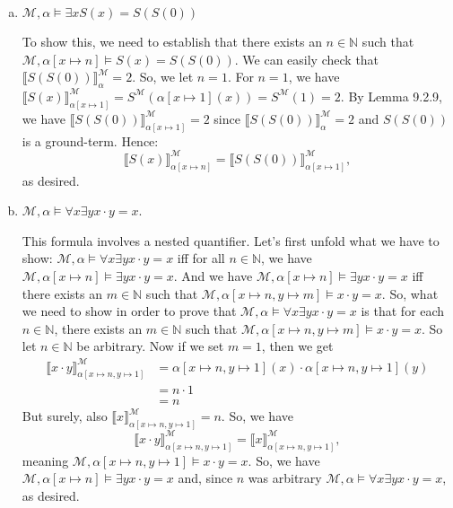 \begin{enumerate}[\thesection.1]
\begin{enumerate}[(i)]
\begin{enumerate}[(a)]
				\item $\mathcal{M},\alpha\vDash \exists x S(x)=S(S(0))$
				
				To show this, we need to establish that there exists an $n\in\mathbb{N}$ such that  $\mathcal{M},\alpha[x\mapsto n]\vDash S(x)=S(S(0))$. We can easily check that $\llbracket S(S(0))\rrbracket_\alpha^\mathcal{M}=2$. So, we let $n=1$. For $n=1$, we have $\llbracket S(x)\rrbracket^\mathcal{M}_{\alpha[x\mapsto 1]}=S^\mathcal{M}(\alpha[x\mapsto 1](x))=S^\mathcal{M}(1)=2$. By Lemma 9.2.9, we have $\llbracket S(S(0))\rrbracket_{\alpha[x\mapsto1]}^\mathcal{M}=2$ since $\llbracket S(S(0))\rrbracket_\alpha^\mathcal{M}=2$ and $S(S(0))$ is a ground-term. Hence: \[\llbracket S(x)\rrbracket^\mathcal{M}_{\alpha[x\mapsto n]}=\llbracket S(S(0))\rrbracket_{\alpha[x\mapsto1]}^\mathcal{M},\] as desired.			
				
				\item $\mathcal{M},\alpha\vDash \forall x\exists y x\cdot y=x$.
				
				This formula involves a nested quantifier. Let's first unfold what we have to show: $\mathcal{M},\alpha\vDash \forall x\exists y x\cdot y=x$ iff for all $n\in\mathbb{N}$, we have $\mathcal{M},\alpha[x\mapsto n]\vDash \exists y x\cdot y=x$. And we have $\mathcal{M},\alpha[x\mapsto n]\vDash \exists y x\cdot y=x$ iff there exists an $m\in\mathbb{N}$ such that $\mathcal{M},\alpha[x\mapsto n, y\mapsto m]\vDash x\cdot y=x$. So, what we need to show in order to prove that $\mathcal{M},\alpha\vDash \forall x\exists y x\cdot y=x$ is that for each $n\in\mathbb{N}$, there exists an $m\in\mathbb{N}$ such that $\mathcal{M},\alpha[x\mapsto n, y\mapsto m]\vDash x\cdot y=x$. So let $n\in\mathbb{N}$ be arbitrary. Now if we set $m=1$, then we get 
				\begin{align*}
				\llbracket x\cdot y\rrbracket^\mathcal{M}_{\alpha[x\mapsto n, y\mapsto 1]}&=\alpha[x\mapsto n, y\mapsto 1](x)\cdot \alpha[x\mapsto n, y\mapsto 1](y)\\
				&=n\cdot 1\\
				&=n
				\end{align*}
			But surely, also $\llbracket x\rrbracket^\mathcal{M}_{\alpha[x\mapsto n, y\mapsto 1]}=n$. So, we have \[\llbracket x\cdot y\rrbracket^\mathcal{M}_{\alpha[x\mapsto n, y\mapsto 1]}=\llbracket x\rrbracket^\mathcal{M}_{\alpha[x\mapsto n, y\mapsto 1]},\] meaning $\mathcal{M},\alpha[x\mapsto n, y\mapsto 1]\vDash x\cdot y=x$. So, we have $\mathcal{M},\alpha[x\mapsto n]\vDash \exists y x\cdot y=x$ and, since $n$ was arbitrary $\mathcal{M},\alpha\vDash \forall x \exists y x\cdot y=x$, as desired.
				

\end{enumerate}
\end{enumerate}
\end{enumerate}
